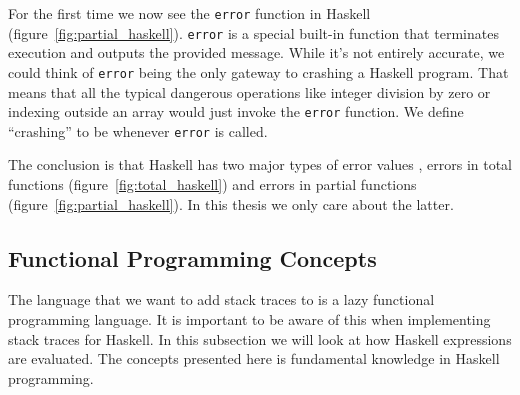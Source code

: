 \begin{figure}
\end{figure}

For the first time we now see the \texttt{error} function in Haskell (figure~\ref{fig:partial_haskell}).  \texttt{error} is a
special built-in function that terminates execution and outputs the provided
message. While it's not entirely accurate, we could think of \texttt{error}
being the only gateway to crashing a Haskell program. That means that all the
typical dangerous operations like integer division by zero or indexing outside
an array would just invoke the \texttt{error} function. We define ``crashing''
to be whenever \texttt{error} is called.

The conclusion is that Haskell has two major types of error
values \cite{o2008real} \cite{ezyang_8_ways_to_report_errors}, errors in total functions (figure~\ref{fig:total_haskell}) and errors in partial functions (figure~\ref{fig:partial_haskell}). In this thesis we only care about the
latter.

\subsection{Functional Programming Concepts}

The language that we want to add stack traces to is a lazy functional
programming language. It is important to be aware of this when
implementing stack traces for Haskell. In this subsection we will look
at how Haskell expressions are evaluated. The concepts presented here
is fundamental knowledge in Haskell programming.

